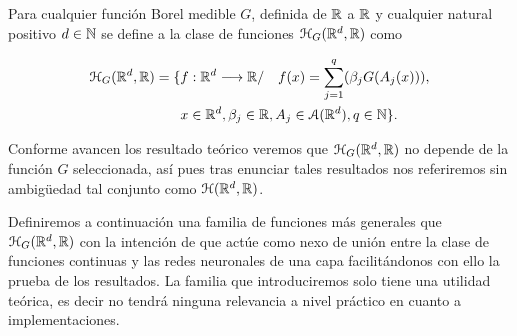 \begin{definicion} 
    Para cualquier función Borel medible $G$, definida de $\mathbb{R}$ a $\mathbb{R}$ y cualquier natural positivo
    $d \in \mathbb{N}$ se define a la clase de funciones $\mathcal{H}_G(\mathbb{R}^d,\mathbb{R})$ como 

    \begin{equation}
        \begin{split}
        \mathcal{H}_G(\mathbb{R}^d,\mathbb{R}) = 
        \{ 
            & f: \mathbb{R} ^d \longrightarrow \mathbb{R} / \quad
            f(x)=\sum_{j = 1} ^q (
            \beta_j G(A_{j}(x))), \\
            & x  \in \mathbb{R} ^d, \beta_j \in \mathbb{R}, A_{j}\in \mathcal{A}(\mathbb{R}^d),q \in \mathbb{N}
        \}.
        \end{split}
    \end{equation}

    Conforme avancen los resultado teórico veremos que $\mathcal{H}_G(\mathbb{R}^d,\mathbb{R})$ 
    no depende de la función $G$ seleccionada, así pues tras enunciar tales resultados nos referiremos sin ambigüedad tal conjunto como $\mathcal{H}(\mathbb{R}^d,\mathbb{R})$.
\end{definicion}


Definiremos a continuación una familia de funciones más generales que $\mathcal{H}_G(\mathbb{R}^d,\mathbb{R})$ con la intención de que actúe como nexo de unión entre la clase de funciones continuas y las redes neuronales de una capa facilitándonos con ello la prueba de los resultados. La familia que introduciremos solo tiene 
una utilidad teórica, es decir no tendrá ninguna relevancia a nivel práctico en cuanto a implementaciones.
   
